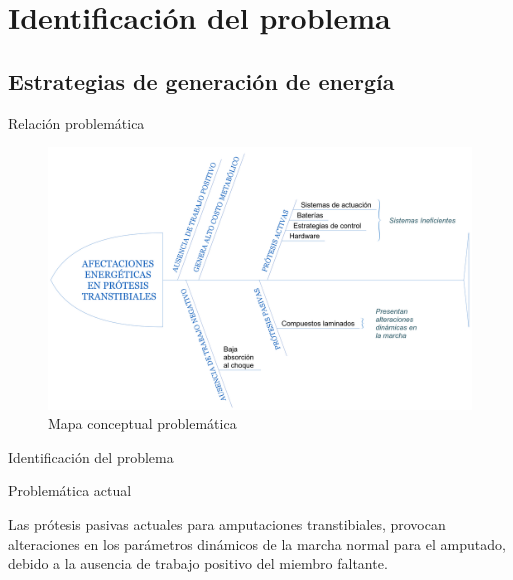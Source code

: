 \documentclass[10pt]{beamer}
\begin{document}
\section{Identificación del problema}

\subsection{Estrategias de generación de energía}

\begin{frame}{Relación problemática}

\begin{figure}
\begin{centering}
\includegraphics[scale=0.12]{Feathergraphics/AfectacionesEnergeticas.png}
\par\end{centering}
\caption{Mapa conceptual problemática}

\end{figure}

\end{frame}

\begin{frame}{Identificación del problema}

\begin{block}{Problemática actual}

Las prótesis pasivas actuales para amputaciones transtibiales, provocan alteraciones en los parámetros dinámicos de la marcha normal para el amputado, debido a la ausencia de trabajo positivo del miembro faltante.

\end{block}
\end{frame}
\end{document}
